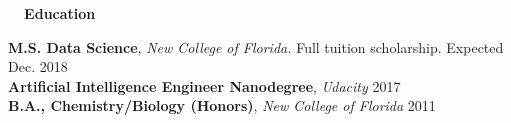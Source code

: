 \documentclass[a4paper,12pt]{article}
\newcommand{\resheading}[1]{{\vspace*{.001in} \colorbox{mygrey}{\begin{minipage}{\textwidth}{\textmd{\large \textbf{#1} \vphantom{p\^{E}}}}\end{minipage}}} }
\newcommand{\ressubheading}[4]{
        \textbf{#1} \hfill #2\\
        \textit{#3} \hfill #4 \\}
\begin{document}



\resheading{~~Education}

\textbf{M.S. Data Science}, \textit{New College of Florida.} Full tuition scholarship. \hfill Expected Dec. 2018\\
\textbf{Artificial Intelligence Engineer Nanodegree}, \textit{Udacity} \hfill 2017\\
\textbf{B.A., Chemistry/Biology (Honors)}, \textit{New College of Florida} \hfill 2011

\end{document}

